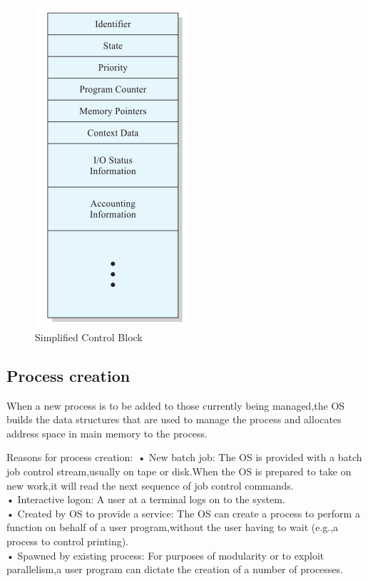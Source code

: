 \\
\\
\begin{figure}
\centering
\includegraphics{img/simplifiedcontrolblock.PNG}
\caption{Simplified Control Block}
\label{fig:simpblock}
\end{figure}


\subsection{Process creation}
When a new process is to be added to those currently being
managed,the OS builds the data structures that are used to manage the process and
allocates address space in main memory to the process. 

Reasons for process creation:\
• New batch job: The OS is provided with a batch job control stream,usually on tape or
disk.When the OS is prepared to take on new work,it will read the
next sequence of job control commands.\\
• Interactive logon: A user at a terminal logs on to the system.\\
• Created by OS to provide a service: The OS can create a process to perform a function on behalf of a user
program,without the user having to wait (e.g.,a process to control
printing).\\
• Spawned by existing process: For purposes of modularity or to exploit parallelism,a user program
can dictate the creation of a number of processes.\\


